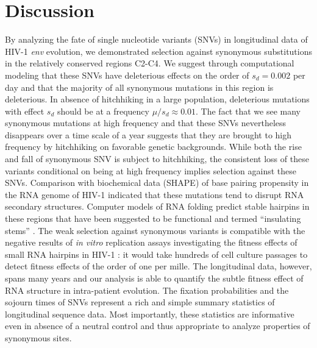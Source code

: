 \documentclass[11pt]{article}
\newcommand{\env}{\textit{env}}
\begin{document}
\section*{Discussion}
By analyzing the fate of single nucleotide variants (SNVs) in
longitudinal data of HIV-1 \env{} evolution, we demonstrated selection
against synonymous substitutions in the relatively conserved regions
C2-C4. We suggest through computational modeling that these SNVs have
deleterious effects on the order of $s_d = 0.002$ per day and that the majority
of all synonymous mutations in this region is deleterious. In absence of hitchhiking
in a large population, deleterious mutations with effect $s_d$ should be
at a frequency $\mu/s_d\approx 0.01$. The fact that we see many
synonymous mutations at high frequency and that these SNVs nevertheless disappears over
a time scale of a year suggests that they are brought to high frequency
by hitchhiking on favorable genetic backgrounds. 
While both the rise and fall of synonymous SNV is subject to hitchhiking,
the consistent loss of these variants conditional on being at high
frequency implies selection against these SNVs.
Comparison with biochemical data (SHAPE) of base pairing propensity in the RNA
genome of HIV-1 indicated that these mutations tend to disrupt RNA 
secondary structures\citep{watts_architecture_2009}. Computer models
of RNA folding predict stable hairpins in these regions that
have been suggested to be functional and termed ``insulating
stems'' \citep{watts_architecture_2009, sanjuan_interplay_2011}.
The weak selection against synonymous variants is compatible with the
negative results of \textit{in vitro} replication assays investigating
the fitness effects of small RNA hairpins in HIV-1
\citep{knoepfel_role_2013}: it would take hundreds of cell culture
passages to detect fitness effects of the order of one per mille. The longitudinal data,
however, spans many years and our analysis is able to quantify the
subtle fitness effect of RNA structure in intra-patient evolution. 
The fixation probabilities and the sojourn times of SNVs represent a
rich and simple summary statistics of longitudinal sequence data. Most
importantly, these statistics are informative even in absence of a
neutral control and thus appropriate to analyze properties of synonymous
sites. 
\end{document}

